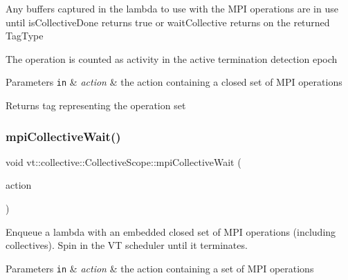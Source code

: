Any buffers captured in the lambda to use with the M\+PI operations are in use until {\ttfamily is\+Collective\+Done} returns {\ttfamily true} or {\ttfamily wait\+Collective} returns on the returned {\ttfamily Tag\+Type} 

The operation is counted as activity in the active termination detection epoch


\begin{DoxyParams}[1]{Parameters}
\mbox{\tt in}  & {\em action} & the action containing a closed set of M\+PI operations\\
\hline
\end{DoxyParams}
\begin{DoxyReturn}{Returns}
tag representing the operation set 
\end{DoxyReturn}
\mbox{\label{structvt_1_1collective_1_1_collective_scope_a0ef41233afe63fc9ead8431e226af193}} 
\subsubsection{\texorpdfstring{mpi\+Collective\+Wait()}{mpiCollectiveWait()}}
{\footnotesize\ttfamily void vt\+::collective\+::\+Collective\+Scope\+::mpi\+Collective\+Wait (\begin{DoxyParamCaption}\item[{\hyperlink{namespacevt_ae0a5a7b18cc99d7b732cb4d44f46b0f3}{Action\+Type}}]{action }\end{DoxyParamCaption})}



Enqueue a lambda with an embedded closed set of M\+PI operations (including collectives). Spin in the VT scheduler until it terminates. 


\begin{DoxyParams}[1]{Parameters}
\mbox{\tt in}  & {\em action} & the action containing a set of M\+PI operations \\
\hline
\end{DoxyParams}
\mbox{\label{structvt_1_1collective_1_1_collective_scope_a4a756e93437119e20a72dfe0d9ede190}} 

